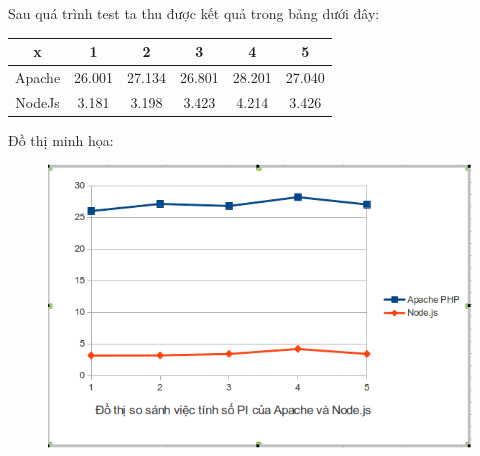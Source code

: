 Sau quá trình test ta thu được kết quả trong bảng dưới đây:	\\
	\begin{tabular}{|c|c|c|c|c|c|}
		\hline
		x & 1 & 2 & 3 & 4 & 5 \\
		\hline
		Apache & 26.001 & 27.134 & 26.801 & 28.201 & 27.040 \\
		\hline
		NodeJs & 3.181 & 3.198 & 3.423 & 4.214 & 3.426
		\\ \hline
	\end{tabular}


Đồ thị minh họa:\\
	\begin{figure}[-h]
		\centering
		\includegraphics[scale=0.6]{1_2.png}
	\end{figure}

